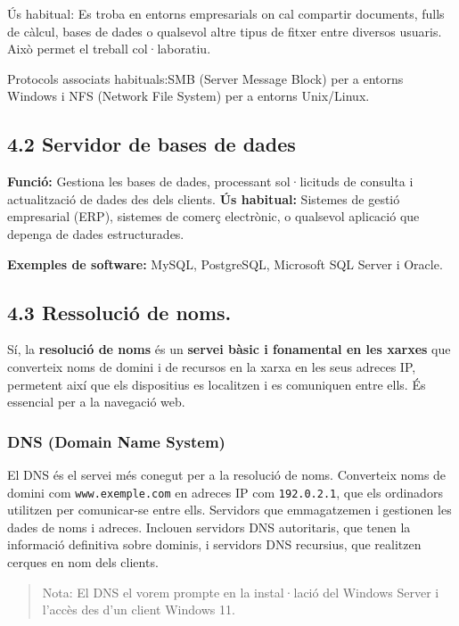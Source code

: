 \documentclass[
  a4paper,
]{article}
\begin{document}
Ús habitual: Es troba en entorns empresarials on cal compartir
documents, fulls de càlcul, bases de dades o qualsevol altre tipus de
fitxer entre diversos usuaris. Això permet el treball col·laboratiu.

Protocols associats habituals:SMB (Server Message Block) per a entorns
Windows i NFS (Network File System) per a entorns Unix/Linux.

\subsection{4.2 Servidor de bases de
dades}\label{servidor-de-bases-de-dades}

\textbf{Funció:} Gestiona les bases de dades, processant sol·licituds de
consulta i actualització de dades des dels clients. \textbf{Ús
habitual:} Sistemes de gestió empresarial (ERP), sistemes de comerç
electrònic, o qualsevol aplicació que depenga de dades estructurades.

\textbf{Exemples de software:} MySQL, PostgreSQL, Microsoft SQL Server i
Oracle.

\subsection{4.3 Ressolució de noms.}\label{ressoluciuxf3-de-noms.}

Sí, la \textbf{resolució de noms} és un \textbf{servei bàsic i
fonamental en les xarxes} que converteix noms de domini i de recursos en
la xarxa en les seus adreces IP, permetent així que els dispositius es
localitzen i es comuniquen entre ells. És essencial per a la navegació
web.

\subsubsection{DNS (Domain Name System)}\label{dns-domain-name-system}

El DNS és el servei més conegut per a la resolució de noms. Converteix
noms de domini com \texttt{www.exemple.com} en adreces IP com
\texttt{192.0.2.1}, que els ordinadors utilitzen per comunicar-se entre
ells. Servidors que emmagatzemen i gestionen les dades de noms i
adreces. Inclouen servidors DNS autoritaris, que tenen la informació
definitiva sobre dominis, i servidors DNS recursius, que realitzen
cerques en nom dels clients.

\begin{quote}
Nota: El DNS el vorem prompte en la instal·lació del Windows Server i
l'accès des d'un client Windows 11.
\end{quote}
\end{document}

